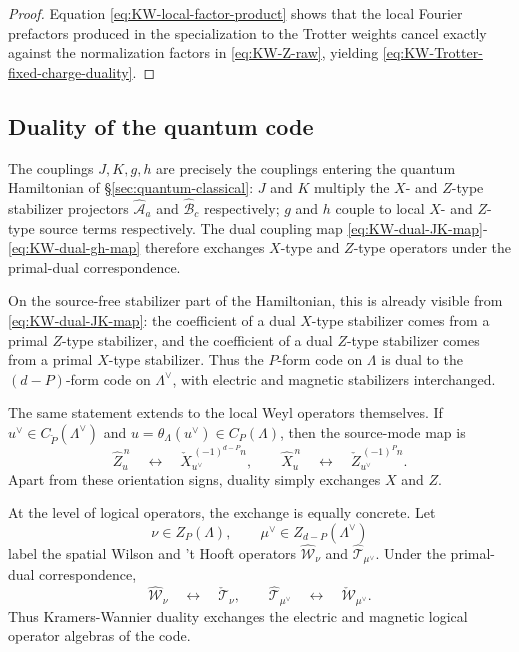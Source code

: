 \begin{proof}
	Equation \eqref{eq:KW-local-factor-product} shows that the local Fourier prefactors
	produced in the specialization to the Trotter weights cancel exactly against the normalization factors in \eqref{eq:KW-Z-raw}, yielding
	\eqref{eq:KW-Trotter-fixed-charge-duality}.
\end{proof}

\subsection{Duality of the quantum code}
\label{sec:KW-quantum-code}

The couplings \(J,K,g,h\) are precisely the couplings entering the quantum Hamiltonian of
\S\ref{sec:quantum-classical}: \(J\) and $K$ multiply the \(X\)- and $Z$-type stabilizer projectors
\(\hat{\mathcal A}_a\) and \(\hat{\mathcal B}_c\) respectively;  \(g\) and $h$ couple to local \(X\)- and $Z$-type source terms respectively. The dual coupling map
\eqref{eq:KW-dual-JK-map}-\eqref{eq:KW-dual-gh-map} therefore exchanges \(X\)-type and
\(Z\)-type operators under the primal-dual correspondence.

On the source-free stabilizer part of the Hamiltonian, this is already visible from
\eqref{eq:KW-dual-JK-map}: the coefficient of a dual \(X\)-type stabilizer comes from a
primal \(Z\)-type stabilizer, and the coefficient of a dual \(Z\)-type stabilizer comes
from a primal \(X\)-type stabilizer. Thus the \(P\)-form code on \(\Lambda\) is dual to
the \((d-P)\)-form code on \(\Lambda^\vee\), with electric and magnetic stabilizers
interchanged.

The same statement extends to the local Weyl operators themselves. If
\(u^\vee\in C_{\check P}(\Lambda^\vee)\) and \(u=\theta_\Lambda(u^\vee)\in C_P(\Lambda)\),
then the source-mode map is
\begin{equation}
	\hat Z_u^{\,n}
	\quad\longleftrightarrow\quad
	\check X_{u^\vee}^{\,(-1)^{d-P}n},
	\qquad
	\hat X_u^{\,n}
	\quad\longleftrightarrow\quad
	\check Z_{u^\vee}^{\,(-1)^P n}.
	\label{eq:KW-local-XZ-swap}
\end{equation}
Apart from these orientation signs, duality simply exchanges \(X\) and \(Z\).

At the level of logical operators, the exchange is equally concrete. Let
\begin{equation}
\nu\in Z_P(\Lambda),
\qquad
\mu^\vee\in Z_{d-P}(\Lambda^\vee)
\end{equation}
label the spatial Wilson and 't Hooft operators
\(\hat{\mathcal W}_\nu\) and \(\hat{\mathcal T}_{\mu^\vee}\). Under the primal-dual
correspondence,
\begin{equation}
	\hat{\mathcal W}_\nu
	\quad\longleftrightarrow\quad
	\check{\mathcal T}_{\nu},
	\qquad
	\hat{\mathcal T}_{\mu^\vee}
	\quad\longleftrightarrow\quad
	\check{\mathcal W}_{\mu^\vee}.
	\label{eq:KW-logical-operator-swap}
\end{equation}
Thus Kramers-Wannier duality exchanges the electric and magnetic logical operator algebras
of the code.

